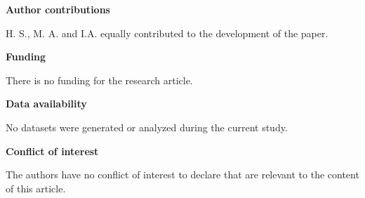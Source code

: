 \documentclass[reqno,11pt]{amsart}
\theoremstyle{plain}
\numberwithin{equation}{section}
\begin{document}
\begin{center}
\textbf{Author contributions}
\end{center}

H. S., M. A. and I.A. equally contributed to the development of the paper.

\begin{center}
\textbf{Funding}
\end{center}

There is no funding for the research article.

\begin{center}
\textbf{Data availability}
\end{center}

No datasets were generated or analyzed during the current study.

\begin{center}
\textbf{Conflict of interest}
\end{center}

The authors have no conflict of interest to declare that are relevant to the
content of this article.
\end{document}
